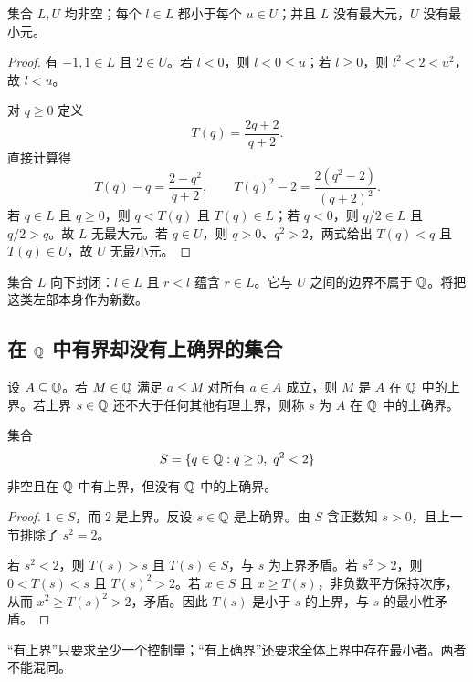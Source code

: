 \begin{proposition}
集合 \(L,U\) 均非空；每个 \(l\in L\) 都小于每个 \(u\in U\)；并且 \(L\) 没有最大元，\(U\) 没有最小元。
\end{proposition}

\begin{proof}
有 \(-1,1\in L\) 且 \(2\in U\)。若 \(l<0\)，则 \(l<0\le u\)；若 \(l\ge0\)，则 \(l^2<2<u^2\)，故 \(l<u\)。

对 \(q\ge0\) 定义
\[
 T(q)=\frac{2q+2}{q+2}.
\]
直接计算得
\[
 T(q)-q=\frac{2-q^2}{q+2},\qquad
 T(q)^2-2=\frac{2(q^2-2)}{(q+2)^2}.
\]
若 \(q\in L\) 且 \(q\ge0\)，则 \(q<T(q)\) 且 \(T(q)\in L\)；若 \(q<0\)，则 \(q/2\in L\) 且 \(q/2>q\)。故 \(L\) 无最大元。若 \(q\in U\)，则 \(q>0\)、\(q^2>2\)，两式给出 \(T(q)<q\) 且 \(T(q)\in U\)，故 \(U\) 无最小元。
\end{proof}

集合 \(L\) 向下封闭：\(l\in L\) 且 \(r<l\) 蕴含 \(r\in L\)。它与 \(U\) 之间的边界不属于 \(\mathbb{Q}\)。将把这类左部本身作为新数。

\subsection{在 \texorpdfstring{\(\mathbb{Q}\)}{Q} 中有界却没有上确界的集合}


\begin{definition}
设 \(A\subseteq\mathbb{Q}\)。若 \(M\in\mathbb{Q}\) 满足 \(a\le M\) 对所有 \(a\in A\) 成立，则 \(M\) 是 \(A\) 在 \(\mathbb{Q}\) 中的上界。若上界 \(s\in\mathbb{Q}\) 还不大于任何其他有理上界，则称 \(s\) 为 \(A\) 在 \(\mathbb{Q}\) 中的上确界。
\end{definition}

\begin{theorem}
集合
\[
 S=\{q\in\Q:q\ge0,\ q^2<2\}
\]
非空且在 \(\mathbb{Q}\) 中有上界，但没有 \(\mathbb{Q}\) 中的上确界。
\end{theorem}

\begin{proof}
\(1\in S\)，而 \(2\) 是上界。反设 \(s\in\mathbb{Q}\) 是上确界。由 \(S\) 含正数知 \(s>0\)，且上一节排除了 \(s^2=2\)。

若 \(s^2<2\)，则 \(T(s)>s\) 且 \(T(s)\in S\)，与 \(s\) 为上界矛盾。若 \(s^2>2\)，则 \(0<T(s)<s\) 且 \(T(s)^2>2\)。若 \(x\in S\) 且 \(x\ge T(s)\)，非负数平方保持次序，从而 \(x^2\ge T(s)^2>2\)，矛盾。因此 \(T(s)\) 是小于 \(s\) 的上界，与 \(s\) 的最小性矛盾。
\end{proof}

“有上界”只要求至少一个控制量；“有上确界”还要求全体上界中存在最小者。两者不能混同。

